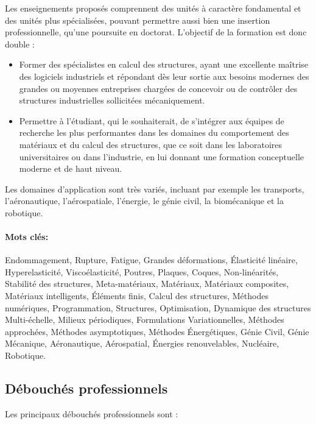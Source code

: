 \documentclass[french,11pt]{article}
\begin{document}
Les enseignements proposés comprennent des unités à caractère fondamental et des unités plus spécialisées, pouvant permettre aussi bien une insertion professionnelle, qu'une poursuite en doctorat. L'objectif de la formation est donc double :
\begin{itemize}
\item Former des spécialistes en calcul des structures, ayant une excellente maîtrise des logiciels industriels et répondant dès leur sortie aux besoins modernes des grandes ou moyennes entreprises chargées de concevoir ou de contrôler des structures industrielles sollicitées mécaniquement.

\item Permettre à l'étudiant, qui le souhaiterait, de s'intégrer aux équipes de recherche les plus performantes dans les domaines du comportement des matériaux et du calcul des structures, que ce soit dans les laboratoires universitaires ou dans l'industrie, en lui donnant une formation conceptuelle moderne et de haut niveau. 
\end{itemize}


Les domaines d'application sont très variés, incluant par exemple les
transports, l’aéronautique, l'aérospatiale, l'énergie, le génie civil, la biomécanique et la robotique.



\paragraph{Mots clés:}
Endommagement, Rupture, Fatigue, Grandes déformations, Élasticité linéaire, Hyperelasticité,
 Viscoélasticité, Poutres, Plaques, Coques, 
Non-linéarités, Stabilité des structures,  Meta-matériaux,  Matériaux,  Matériaux composites,
 Matériaux intelligents,
Éléments finis, Calcul des structures,  Méthodes numériques, Programmation,
Structures, Optimisation, Dynamique des structures
Multi-échelle, Milieux périodiques, 
Formulations Variationnelles, Méthodes approchées, Méthodes asymptotiques,    Méthodes Énergétiques, Génie Civil, Génie Mécanique,
Aéronautique, Aérospatial, Énergies renouvelables,  
Nucléaire, Robotique. 
\subsection{Débouchés professionnels}

Les principaux débouchés professionnels sont :
\end{document}
